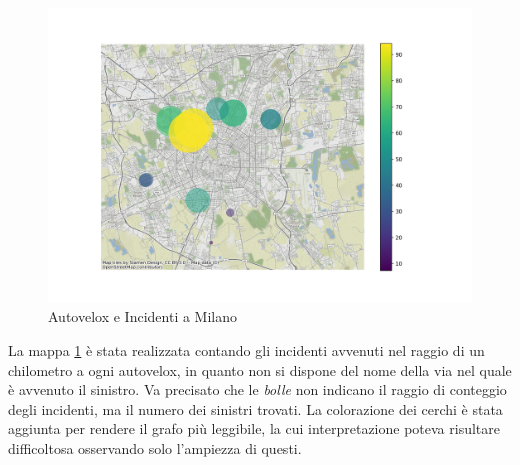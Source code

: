 \documentclass[a4paper,12pt]{report}
\newcommand{\quotestyle}[1]{\textit{#1}}
\begin{document}
\begin{figure}
    \includegraphics[width=\linewidth]{../src/autovelox/autovelox_incidenti.png}
    \caption{Autovelox e Incidenti a Milano}
    \label{fig:autovelox-incidenti}
\end{figure}

La mappa \ref{fig:autovelox-incidenti} è stata realizzata contando gli incidenti avvenuti 
nel raggio di un chilometro a ogni autovelox, in quanto non si dispone del nome della 
via nel quale è avvenuto il sinistro. 
Va precisato che le \quotestyle{bolle} non indicano il raggio di conteggio degli incidenti, ma 
il numero dei sinistri trovati. 
La colorazione dei cerchi è stata aggiunta per 
rendere il grafo più leggibile, la cui interpretazione poteva risultare difficoltosa 
osservando solo l'ampiezza di questi.
\end{document}

